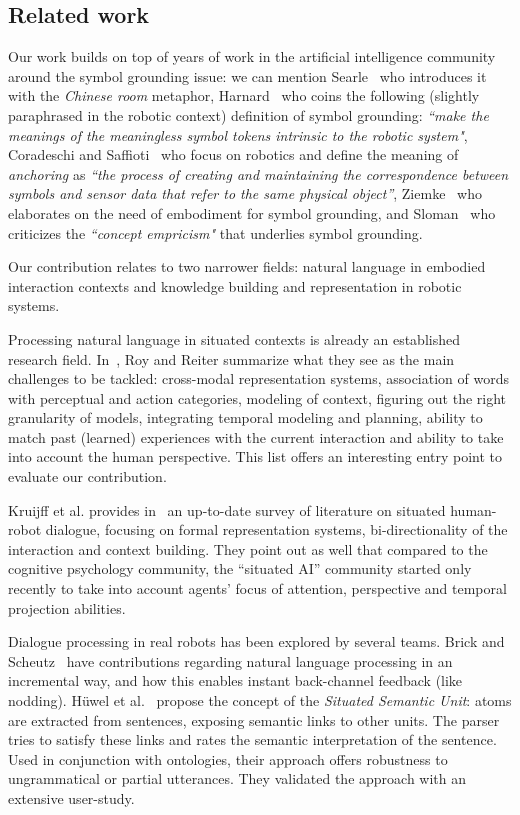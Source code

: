\documentclass[twocolumn]{svjour3}
\begin{document}
\subsection{Related work}

Our work builds on top of years of work in the artificial intelligence
community around the symbol grounding issue: we can mention
Searle~\cite{Searle1980} who introduces it with the \emph{Chinese room}
metaphor, Harnard~\cite{Harnad1990} who coins the following (slightly
paraphrased in the robotic context) definition of symbol grounding:
\emph{``make the meanings of the meaningless symbol tokens intrinsic to the
robotic system"}, Coradeschi and Saffioti~\cite{Coradeschi2003} who focus on
robotics and define the meaning of \emph{anchoring} as \emph{``the process of
creating and maintaining the correspondence between symbols and sensor data
that refer to the same physical object''}, Ziemke~\cite{Ziemke1999} who
elaborates on the need of embodiment for symbol grounding, and
Sloman~\cite{Sloman2007} who criticizes the \emph{``concept empricism"} that
underlies symbol grounding.

Our contribution relates to two narrower fields: natural language in embodied
interaction contexts and knowledge building and representation in robotic
systems.

Processing natural language in situated contexts is already an established
research field. In~\cite{Roy2005}, Roy and Reiter summarize what they see as
the main challenges to be tackled: cross-modal representation systems,
association of words with perceptual and action categories, modeling of
context, figuring out the right granularity of models, integrating temporal
modeling and planning, ability to match past (learned) experiences with the
current interaction and ability to take into account the human perspective.
This list offers an interesting entry point to evaluate our contribution.

Kruijff et al. provides in~\cite{Kruijff2010} an up-to-date survey of
literature on situated human-robot dialogue, focusing on formal representation
systems, bi-directionality of the interaction and context building. They point
out as well that compared to the cognitive psychology community, the ``situated
AI'' community started only recently to take into account agents' focus of
attention, perspective and temporal projection abilities.

Dialogue processing in real robots has been explored by several teams.  Brick
and Scheutz~\cite{Brick2007} have contributions regarding natural language
processing in an incremental way, and how this enables instant back-channel
feedback (like nodding). H\"uwel et al.~\cite{Huwel2006} propose the concept of the
\textit{Situated Semantic Unit}: atoms are extracted from sentences, exposing
semantic links to other units. The parser tries to satisfy these links and
rates the semantic interpretation of the sentence. Used in conjunction with
ontologies, their approach offers robustness to ungrammatical or partial
utterances. They validated the approach with an extensive user-study.
\end{document}
